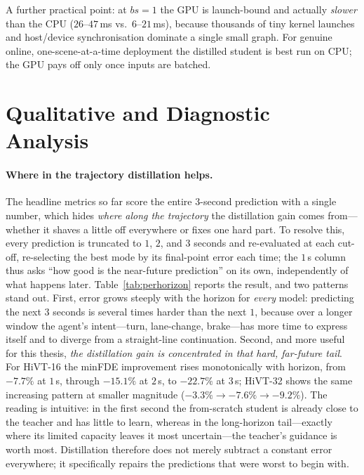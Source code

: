 A further practical point: at $bs{=}1$ the GPU is launch-bound and actually
\emph{slower} than the CPU ($26$--$47$\,ms vs.\ $6$--$21$\,ms), because thousands of
tiny kernel launches and host/device synchronisation dominate a single small graph.
For genuine online, one-scene-at-a-time deployment the distilled student is best run
on CPU; the GPU pays off only once inputs are batched.

\section{Qualitative and Diagnostic Analysis}
\label{sec:res_qual}

\paragraph{Where in the trajectory distillation helps.}
The headline metrics so far score the entire $3$-second prediction with a single
number, which hides \emph{where along the trajectory} the distillation gain comes
from---whether it shaves a little off everywhere or fixes one hard part. To
resolve this, every prediction is truncated to $1$, $2$, and $3$ seconds and
re-evaluated at each cut-off, re-selecting the best mode by its final-point error
each time; the $1$\,s column thus asks ``how good is the near-future prediction''
on its own, independently of what happens later. Table~\ref{tab:perhorizon}
reports the result, and two patterns stand out. First, error grows steeply with
the horizon for \emph{every} model: predicting the next $3$ seconds is several
times harder than the next $1$, because over a longer window the agent's
intent---turn, lane-change, brake---has more time to express itself and to
diverge from a straight-line continuation. Second, and more useful for this
thesis, \emph{the distillation gain is concentrated in that hard, far-future
tail}. For HiVT-16 the minFDE improvement rises monotonically with horizon, from
$-7.7\%$ at $1$\,s, through $-15.1\%$ at $2$\,s, to $-22.7\%$ at $3$\,s; HiVT-32
shows the same increasing pattern at smaller magnitude
($-3.3\%\rightarrow-7.6\%\rightarrow-9.2\%$). The reading is intuitive: in the
first second the from-scratch student is already close to the teacher and has
little to learn, whereas in the long-horizon tail---exactly where its limited
capacity leaves it most uncertain---the teacher's guidance is worth most.
Distillation therefore does not merely subtract a constant error everywhere; it
specifically repairs the predictions that were worst to begin with.

